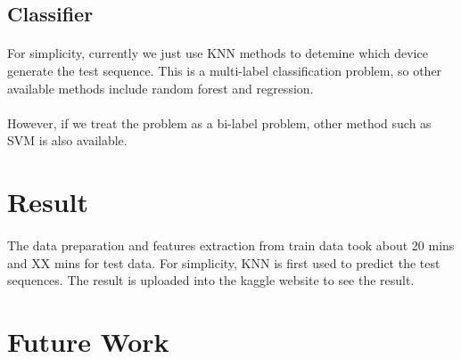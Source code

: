 \documentclass{article}
\begin{document}
	
		\subsection{Classifier} %
		\label{sub:classifier}
		\paragraph{} For simplicity, currently we just use KNN methods to detemine which device generate the test sequence. This is a multi-label classification problem, so other available methods include random forest and regression. 
		
		\paragraph{} However, if we treat the problem as a bi-label problem, other method such as SVM is also available. 
	
	\section{Result} %
	\label{sec:result}
	\paragraph{} The data preparation and features extraction from train data took about 20 mins and XX mins for test data. For simplicity, KNN is first used to predict the test sequences. The result is uploaded into the kaggle website to see the result. 
	
	
	
	\section{Future Work} %
	\label{sec:future_work}
	
	
\end{document}
